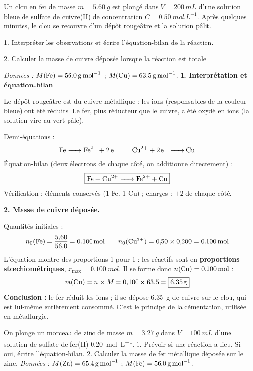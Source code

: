 \documentclass[11pt]{article}
\begin{document}
\begin{exoresolu}
Un clou en fer de masse $m = \SI{5,60}{g}$ est plongé dans $V = \SI{200}{mL}$ d'une solution bleue de sulfate de cuivre(II) de concentration $C = \SI{0,50}{mol.L^{-1}}$. Après quelques minutes, le clou se recouvre d'un dépôt rougeâtre et la solution pâlit.\par
1. Interpréter les observations et écrire l'équation-bilan de la réaction.\par
2. Calculer la masse de cuivre déposée lorsque la réaction est totale.\par
\emph{Données :} $M(\ce{Fe}) = \SI{56,0}{g.mol^{-1}}$ ; $M(\ce{Cu}) = \SI{63,5}{g.mol^{-1}}$.
\tcblower
\textbf{1. Interprétation et équation-bilan.}\par
Le dépôt rougeâtre est du cuivre métallique : les ions  (responsables de la couleur bleue) ont été réduits. Le fer, plus réducteur que le cuivre, a été oxydé en ions  (la solution vire au vert pâle).\par
Demi-équations :
\[ \ce{Fe -> Fe^{2+} + 2e^-} \qquad \ce{Cu^{2+} + 2e^- -> Cu} \]
Équation-bilan (deux électrons de chaque côté, on additionne directement) :
\[ \boxed{\ce{Fe + Cu^{2+} -> Fe^{2+} + Cu}} \]
Vérification : éléments conservés (1 Fe, 1 Cu) ; charges : $+2$ de chaque côté.\par
\textbf{2. Masse de cuivre déposée.}\par
Quantités initiales :
\[ n_0(\ce{Fe}) = \frac{5{,}60}{56{,}0} = \SI{0,100}{mol} \qquad n_0(\ce{Cu^{2+}}) = 0{,}50 \times 0{,}200 = \SI{0,100}{mol} \]
L'équation montre des proportions 1 pour 1 : les réactifs sont en \textbf{proportions stœchiométriques}, $x_{\max} = \SI{0,100}{mol}$. Il se forme donc $n(\ce{Cu}) = \SI{0,100}{mol}$ :
\[ m(\ce{Cu}) = n \times M = 0{,}100 \times 63{,}5 = \boxed{\SI{6,35}{g}} \]
\textbf{Conclusion :} le fer réduit les ions  ; il se dépose \SI{6,35}{g} de cuivre sur le clou, qui est lui-même entièrement consommé. C'est le principe de la cémentation, utilisée en métallurgie.
\end{exoresolu}

\begin{exercice}
On plonge un morceau de zinc de masse $m = \SI{3,27}{g}$ dans $V = \SI{100}{mL}$ d'une solution de sulfate de fer(II) \SI{0,20}{mol.L^{-1}}.
1. Prévoir si une réaction a lieu. Si oui, écrire l'équation-bilan.
2. Calculer la masse de fer métallique déposée sur le zinc.
\emph{Données :} $M(\ce{Zn}) = \SI{65,4}{g.mol^{-1}}$ ; $M(\ce{Fe}) = \SI{56,0}{g.mol^{-1}}$.
\end{exercice}
\end{document}
